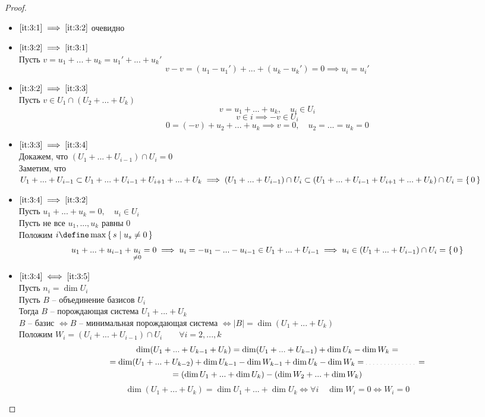 \begin{proof}
    \hfill
    \begin{itemize}
        \item $ \ref{it:3:1} \implies \ref{it:3:2} $ очевидно
        \item $ \ref{it:3:2} \implies \ref{it:3:1} $ \\
        Пусть $ v = u_1 + ... + u_k = u_1' + ... + u_k' $
        $$ v - v = (u_1 - u_1') + ... + (u_k - u_k') = 0 \implies u_i = u_i' $$
        \item $ \ref{it:3:2} \implies \ref{it:3:3} $ \\
        Пусть $v \in U_1 \cap (U_2 + ... + U_k) $
        $$ v = u_1 + ... + u_k, \quad u_i \in U_i $$
        $$ v \in i \implies -v \in U_i $$
        $$ 0 = (-v) + u_2 + ... + u_k \implies v = 0, \quad u_2 = ... = u_k = 0 $$
        \item $ \ref{it:3:3} \implies \ref{it:3:4} $ \\
        Докажем, что $ (U_1 + ... + U_{i - 1}) \cap U_i = 0 $ \\
        Заметим, что $ U_1 + ... + U_{i - 1} \subset U_1 + ... + U_{i - 1} + U_{i + 1} + ... + U_k \implies (U_1 + ... + U_{i - 1}) \cap U_i \subset (U_1 + ... + U_{i - 1} + U_{i + 1} + ... + U_k) \cap U_i = \set{0} $
        \item $ \ref{it:3:4} \implies \ref{it:3:2} $ \\
        Пусть $ u_1 + ... + u_k = 0, \quad u_i \in U_i $ \\
        Пусть не все $ u_1, ..., u_k $ равны 0 \\
        Положим $ i \define \max\set{s | u_s \ne 0} $
        $$ u_1 + ... + u_{i - 1} + \underset{\ne 0}{u_i} = 0 \implies u_i = -u_1 - ... - u_{i - 1} \in U_1 + ... + U_{i - 1} \implies u_i \in (U_1 + ... + U_{i - 1}) \cap U_i = \set{0} $$
        \item $ \ref{it:3:4} \iff \ref{it:3:5} $ \\
        Пусть $n_i = \dim U_i $ \\
        Пусть $B$ -- объединение базисов $U_i$ \\
        Тогда $B$ -- порождающая система $U_1 + ... + U_k $ \\
        $B$ -- базис $ \iff B $ -- минимальная порождающая система $ \iff |B| = \dim (U_1 + ... + U_k) $ \\
		Положим $ W_i = (U_i + ... + U_{i - 1}) \cap U_i \qquad \forall i = 2, ..., k $
		\begin{multline*}
			\dim (U_1 + ... + U_{k - 1} + U_k) = \dim (U_1 + ... + U_{k - 1}) + \dim U_k - \dim W_k = \\ = \dim (U_1 + ... + U_{k - 2}) + \dim U_{k - 1} - \dim W_{k - 1} + \dim U_k - \dim W_k = \widedots[6em] = \\ = (\dim U_1 + ... + \dim U_k) - (\dim W_2 + ... + \dim W_k)
		\end{multline*}
		$$ \dim(U_1 + ... + U_k) = \dim U_1 + ... + \dim U_k \iff \forall i \quad \dim W_i = 0 \iff W_i = 0 $$
    \end{itemize}
\end{proof}

